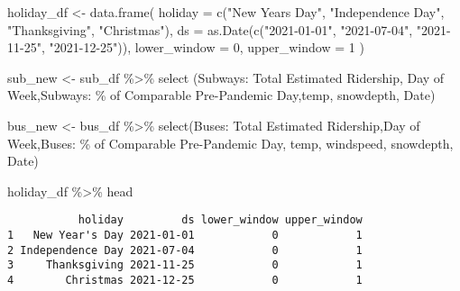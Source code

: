 \documentclass[
  letterpaper,
  DIV=11,
  numbers=noendperiod]{scrartcl}
\newenvironment{Shaded}{\begin{snugshade}}{\end{snugshade}}
\newcommand{\AttributeTok}[1]{\textcolor[rgb]{0.40,0.45,0.13}{#1}}
\newcommand{\DecValTok}[1]{\textcolor[rgb]{0.68,0.00,0.00}{#1}}
\newcommand{\FunctionTok}[1]{\textcolor[rgb]{0.28,0.35,0.67}{#1}}
\newcommand{\NormalTok}[1]{\textcolor[rgb]{0.00,0.23,0.31}{#1}}
\newcommand{\OtherTok}[1]{\textcolor[rgb]{0.00,0.23,0.31}{#1}}
\newcommand{\SpecialCharTok}[1]{\textcolor[rgb]{0.37,0.37,0.37}{#1}}
\newcommand{\StringTok}[1]{\textcolor[rgb]{0.13,0.47,0.30}{#1}}
\begin{document}
\begin{Shaded}
\begin{Highlighting}[]
\NormalTok{holiday\_df }\OtherTok{\textless{}{-}} \FunctionTok{data.frame}\NormalTok{(}
  \AttributeTok{holiday =} \FunctionTok{c}\NormalTok{(}\StringTok{"New Year\textquotesingle{}s Day"}\NormalTok{, }\StringTok{"Independence Day"}\NormalTok{, }\StringTok{"Thanksgiving"}\NormalTok{, }\StringTok{"Christmas"}\NormalTok{),}
  \AttributeTok{ds =} \FunctionTok{as.Date}\NormalTok{(}\FunctionTok{c}\NormalTok{(}\StringTok{"2021{-}01{-}01"}\NormalTok{, }\StringTok{"2021{-}07{-}04"}\NormalTok{, }\StringTok{"2021{-}11{-}25"}\NormalTok{, }\StringTok{"2021{-}12{-}25"}\NormalTok{)),}
  \AttributeTok{lower\_window =} \DecValTok{0}\NormalTok{,}
  \AttributeTok{upper\_window =} \DecValTok{1}
\NormalTok{)}

\NormalTok{sub\_new }\OtherTok{\textless{}{-}}\NormalTok{ sub\_df }\SpecialCharTok{\%\textgreater{}\%}
  \FunctionTok{select}\NormalTok{ (}\StringTok{\textasciigrave{}}\AttributeTok{Subways: Total Estimated Ridership}\StringTok{\textasciigrave{}}\NormalTok{, }\StringTok{\textasciigrave{}}\AttributeTok{Day of Week}\StringTok{\textasciigrave{}}\NormalTok{,}\StringTok{\textasciigrave{}}\AttributeTok{Subways: \% of Comparable Pre{-}Pandemic Day}\StringTok{\textasciigrave{}}\NormalTok{,temp, snowdepth, Date)}

\NormalTok{bus\_new }\OtherTok{\textless{}{-}}\NormalTok{ bus\_df }\SpecialCharTok{\%\textgreater{}\%}
  \FunctionTok{select}\NormalTok{(}\StringTok{\textasciigrave{}}\AttributeTok{Buses: Total Estimated Ridership}\StringTok{\textasciigrave{}}\NormalTok{,}\StringTok{\textasciigrave{}}\AttributeTok{Day of Week}\StringTok{\textasciigrave{}}\NormalTok{,}\StringTok{\textasciigrave{}}\AttributeTok{Buses: \% of Comparable Pre{-}Pandemic Day}\StringTok{\textasciigrave{}}\NormalTok{, temp, windspeed, snowdepth, Date)}


\NormalTok{holiday\_df }\SpecialCharTok{\%\textgreater{}\%}\NormalTok{ head}
\end{Highlighting}
\end{Shaded}

\begin{verbatim}
           holiday         ds lower_window upper_window
1   New Year's Day 2021-01-01            0            1
2 Independence Day 2021-07-04            0            1
3     Thanksgiving 2021-11-25            0            1
4        Christmas 2021-12-25            0            1
\end{verbatim}
\end{document}

